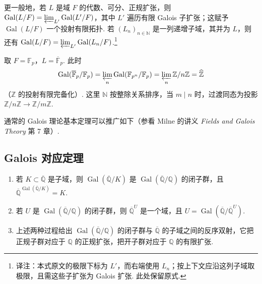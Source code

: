 \begin{remark*}

更一般地，若 $L$ 是域 $F$ 的代数、可分、正规扩张，则 $\operatorname{Gal}(L/F)=\varprojlim_{L'}\operatorname{Gal}(L'/F)$，其中 $L'$ 遍历有限 Galois 子扩张；这赋予 $\operatorname{Gal}(L/F)$ 一个投射有限拓扑. 若 $(L_n)_{n\in\mathbb{N}}$ 是一列递增子域，其并为 $L$，则还有 $\operatorname{Gal}(L/F)=\varprojlim_{L'}\operatorname{Gal}(L_n/F)$.\footnote{译注：本式原文的极限下标为 $L'$，而右端使用 $L_n$；按上下文应沿这列子域取极限，且需这些子扩张为 Galois 扩张. 此处保留原式.}

\end{remark*}

\begin{example*}

取 $F=\mathbb{F}_p$，$L=\overline{\mathbb{F}}_p$. 此时
\begin{align*}
\operatorname{Gal}(\overline{\mathbb{F}}_p/\mathbb{F}_p)=\varprojlim_n\operatorname{Gal}(\mathbb{F}_{p^n}/\mathbb{F}_p)=\varprojlim_n\mathbb{Z}/n\mathbb{Z}=\widehat{\mathbb{Z}}
\end{align*}
（$\mathbb{Z}$ 的投射有限完备化）. 这里 $\mathbb{N}$ 按整除关系排序，当 $m\mid n$ 时，过渡同态为投影 $\mathbb{Z}/n\mathbb{Z}\longrightarrow\mathbb{Z}/m\mathbb{Z}$.

\end{example*}

通常的 Galois 理论基本定理可以推广如下（参看 Milne 的讲义 \emph{Fields and Galois Theory} 第 7 章）.

\subsection{Galois 对应定理}\label{sec:nt-1-1-2}

\begin{theorem*}

\begin{enumerate}[label=\roman*)]

\item 若 $K\subset\overline{\mathbb{Q}}$ 是子域，则 $\operatorname{Gal}(\overline{\mathbb{Q}}/K)$ 是 $\operatorname{Gal}(\overline{\mathbb{Q}}/\mathbb{Q})$ 的闭子群，且 $\overline{\mathbb{Q}}^{\operatorname{Gal}(\overline{\mathbb{Q}}/K)}=K$.

\item 若 $U$ 是 $\operatorname{Gal}(\overline{\mathbb{Q}}/\mathbb{Q})$ 的闭子群，则 $\overline{\mathbb{Q}}^U$ 是一个域，且 $U=\operatorname{Gal}(\overline{\mathbb{Q}}/\overline{\mathbb{Q}}^U)$.

\item 上述两种过程给出 $\operatorname{Gal}(\overline{\mathbb{Q}}/\mathbb{Q})$ 的闭子群与 $\overline{\mathbb{Q}}$ 的子域之间的反序双射，它把正规子群对应于 $\mathbb{Q}$ 的正规扩张，把开子群对应于 $\mathbb{Q}$ 的有限扩张.

\end{enumerate}

\end{theorem*}

